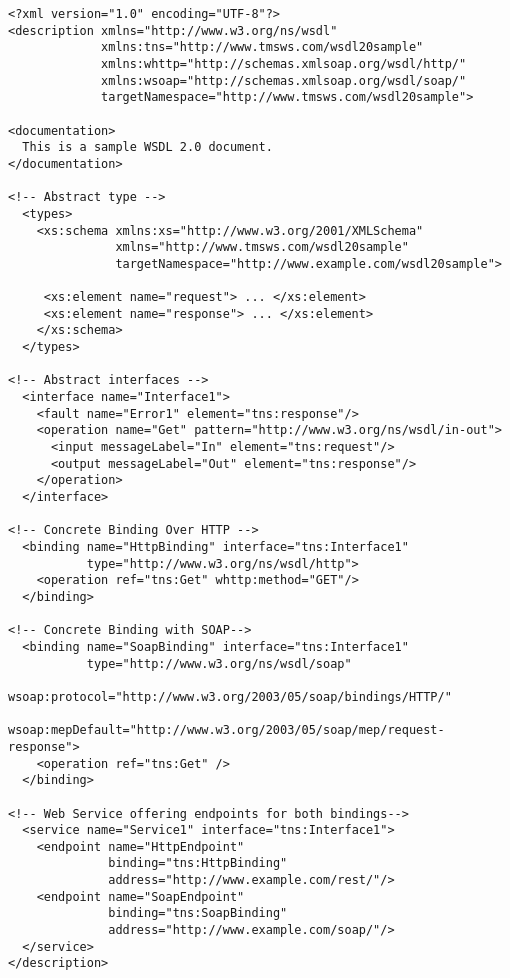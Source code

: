\begin{verbatim}
<?xml version="1.0" encoding="UTF-8"?>
<description xmlns="http://www.w3.org/ns/wsdl"
             xmlns:tns="http://www.tmsws.com/wsdl20sample"
             xmlns:whttp="http://schemas.xmlsoap.org/wsdl/http/"
             xmlns:wsoap="http://schemas.xmlsoap.org/wsdl/soap/"
             targetNamespace="http://www.tmsws.com/wsdl20sample">

<documentation>
  This is a sample WSDL 2.0 document.
</documentation>

<!-- Abstract type -->
  <types>
    <xs:schema xmlns:xs="http://www.w3.org/2001/XMLSchema"
               xmlns="http://www.tmsws.com/wsdl20sample"
               targetNamespace="http://www.example.com/wsdl20sample">

     <xs:element name="request"> ... </xs:element>
     <xs:element name="response"> ... </xs:element>
    </xs:schema>
  </types>

<!-- Abstract interfaces -->
  <interface name="Interface1">
    <fault name="Error1" element="tns:response"/>
    <operation name="Get" pattern="http://www.w3.org/ns/wsdl/in-out">
      <input messageLabel="In" element="tns:request"/>
      <output messageLabel="Out" element="tns:response"/>
    </operation>
  </interface>

<!-- Concrete Binding Over HTTP -->
  <binding name="HttpBinding" interface="tns:Interface1"
           type="http://www.w3.org/ns/wsdl/http">
    <operation ref="tns:Get" whttp:method="GET"/>
  </binding>

<!-- Concrete Binding with SOAP-->
  <binding name="SoapBinding" interface="tns:Interface1"
           type="http://www.w3.org/ns/wsdl/soap"
           wsoap:protocol="http://www.w3.org/2003/05/soap/bindings/HTTP/"
           wsoap:mepDefault="http://www.w3.org/2003/05/soap/mep/request-response">
    <operation ref="tns:Get" />
  </binding>

<!-- Web Service offering endpoints for both bindings-->
  <service name="Service1" interface="tns:Interface1">
    <endpoint name="HttpEndpoint"
              binding="tns:HttpBinding"
              address="http://www.example.com/rest/"/>
    <endpoint name="SoapEndpoint"
              binding="tns:SoapBinding"
              address="http://www.example.com/soap/"/>
  </service>
</description>
\end{verbatim}
